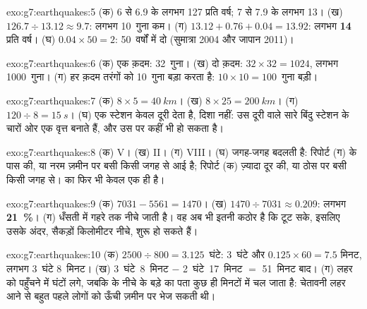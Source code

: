\begin{solution}{exo:g7:earthquakes:5}
(क)  6 से 6.9 के लगभग 127 प्रति वर्ष;  7 से 7.9 के लगभग 13।
(ख) $126.7 \div 13.12 \approx 9.7$: लगभग 10~गुना कम। (ग)
$13.12 + 0.76 + 0.04 = 13.92$: लगभग \textbf{14} प्रति वर्ष। (घ)
$0.04 \times 50 = 2$: 50~वर्षों में दो (सुमात्रा 2004 और जापान 2011)।
\end{solution}

\begin{solution}{exo:g7:earthquakes:6}
(क) एक क़दम: 32~गुना। (ख) दो क़दम: $32 \times 32 = 1024$, लगभग
1000~गुना। (ग) हर क़दम तरंगों को 10~गुना बड़ा करता है: $10 \times 10 =
100$~गुना बड़ी।
\end{solution}

\begin{solution}{exo:g7:earthquakes:7}
(क) $8 \times 5 = \qty{40}{km}$। (ख) $8 \times 25 = \qty{200}{km}$। (ग)
$120 \div 8 = \qty{15}{s}$। (घ) एक स्टेशन केवल दूरी देता है, दिशा नहीं: उस दूरी
वाले सारे बिंदु स्टेशन के चारों ओर एक वृत्त बनाते हैं, और  उस पर कहीं भी
हो सकता है।
\end{solution}

\begin{solution}{exo:g7:earthquakes:8}
(क) V। (ख) II। (ग) VIII। (घ)  जगह-जगह बदलती है: रिपोर्ट (ग) 
के पास की, या नरम ज़मीन पर बसी किसी जगह से आई है; रिपोर्ट (क) ज़्यादा दूर की, या
ठोस  पर बसी किसी जगह से।  का फिर भी केवल एक ही  है।
\end{solution}

\begin{solution}{exo:g7:earthquakes:9}
(क) $7031 - 5561 = 1470$। (ख) $1470 \div 7031 \approx 0.209$: लगभग
\textbf{21~\%}। (ग) धँसती   में गहरे तक नीचे जाती है। वह अब भी इतनी
कठोर है कि टूट सके, इसलिए  उसके अंदर, सैकड़ों किलोमीटर नीचे, शुरू हो
सकते हैं।
\end{solution}

\begin{solution}{exo:g7:earthquakes:10}
(क) $2500 \div 800 = 3.125$~घंटे: 3~घंटे और $0.125 \times 60 = 7.5$
मिनट, लगभग 3~घंटे 8~मिनट। (ख) 3~घंटे~8~मिनट $-$ 2~घंटे~17~मिनट $=$
51~मिनट बाद। (ग) लहर को पहुँचने में घंटों लगे, जबकि  के नीचे के बड़े  का
पता कुछ ही मिनटों में चल जाता है: चेतावनी लहर आने से बहुत पहले लोगों को ऊँची ज़मीन
पर भेज सकती थी।
\end{solution}

